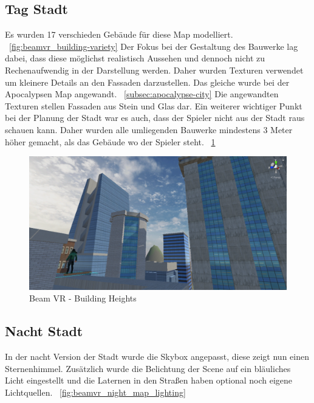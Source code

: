 \subsection{Tag Stadt}\label{subsec:day-city}
Es wurden 17 verschieden Geb\"aude f\"ur diese Map modelliert.
~\ref{fig:beamvr_building-variety}
Der Fokus bei der Gestaltung des Bauwerke lag dabei, dass diese m\"oglichst realistisch Aussehen und dennoch nicht zu Rechenaufwendig in der Darstellung werden.
Daher wurden Texturen verwendet um kleinere Details an den Fassaden darzustellen.
Das gleiche wurde bei der Apocalypsen Map angewandt.
~\ref{subsec:apocalypse-city}
Die angewandten Texturen stellen Fassaden aus Stein und Glas dar.
Ein weiterer wichtiger Punkt bei der Planung der Stadt war es auch, dass der Spieler nicht aus der Stadt raus schauen kann.
Daher wurden alle umliegenden Bauwerke mindestens 3 Meter h\"oher gemacht, als das Geb\"aude wo der Spieler steht.
~\ref{fig:beamvr_building-heights}

\begin {figure}
    \centering
    \includegraphics[scale=0.5]{pics/beamvr_city_day_heights}
    \caption{Beam VR - Building Heights}
    \label{fig:beamvr_building-heights}
\end {figure}

\subsection{Nacht Stadt}\label{subsec:night-city}
In der nacht Version der Stadt wurde die Skybox angepasst, diese zeigt nun einen Sternenhimmel.
Zus\"atzlich wurde die Belichtung der Scene auf ein bl\"auliches Licht eingestellt und die Laternen in den Straßen
haben optional noch eigene Lichtquellen.
~\ref{fig:beamvr_night_map_lighting}

